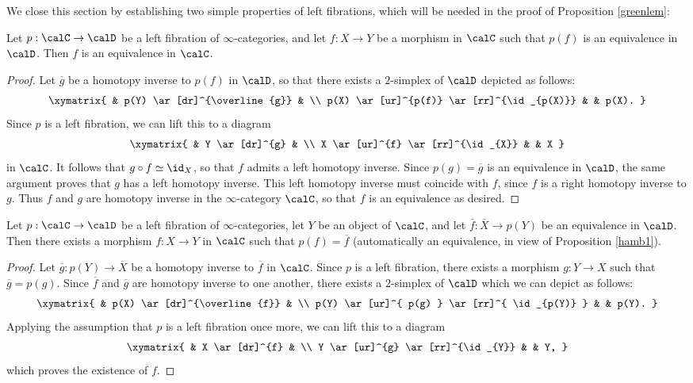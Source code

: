 We close this section by establishing two simple properties of left fibrations, which will be needed in the proof of Proposition \ref{greenlem}:

\begin{proposition}\label{hamb1}
Let $p: \calC \rightarrow \calD$ be a left fibration of $\infty$-categories, and let
$f: X \rightarrow Y$ be a morphism in $\calC$ such that $p(f)$ is an equivalence in
$\calD$. Then $f$ is an equivalence in $\calC$.
\end{proposition}

\begin{proof}
Let $\overline{g}$ be a homotopy inverse to $p(f)$ in $\calD$, so that
there exists a $2$-simplex of $\calD$ depicted as follows:
$$ \xymatrix{ & p(Y) \ar[dr]^{\overline{g}} & \\
p(X) \ar[ur]^{p(f)} \ar[rr]^{\id_{p(X)}} & & p(X). }$$
Since $p$ is a left fibration, we can lift this to a diagram
$$ \xymatrix{ & Y \ar[dr]^{g} & \\
X \ar[ur]^{f} \ar[rr]^{\id_{X}} & & X }$$
in $\calC$. It follows that $g \circ f \simeq \id_{X}$, so that $f$ admits a left homotopy inverse.
Since $p(g) = \overline{g}$ is an equivalence in $\calD$, the same argument proves that
$g$ has a left homotopy inverse. This left homotopy inverse must coincide with $f$, since $f$ is a right homotopy inverse to $g$. Thus $f$ and $g$ are homotopy inverse in the $\infty$-category $\calC$, so that $f$ is an equivalence as desired.
\end{proof}

\begin{proposition}\label{hamb2}
Let $p: \calC \rightarrow \calD$ be a left fibration of $\infty$-categories, let
$Y$ be an object of $\calC$, and let
$\overline{f}: \overline{X} \rightarrow p(Y)$ be an equivalence in $\calD$. Then
there exists a morphism $f: X \rightarrow Y$ in $\calC$ such that $p(f) = \overline{f}$
(automatically an equivalence, in view of Proposition \ref{hamb1}). 
\end{proposition}

\begin{proof}
Let $\overline{g}: p(Y) \rightarrow \overline{X}$ be a homotopy inverse to $\overline{f}$
in $\calC$. Since $p$ is a left fibration, there exists a morphism
$g: Y \rightarrow X$ such that $\overline{g} = p(g)$. Since $\overline{f}$ and $\overline{g}$
are homotopy inverse to one another, there exists a $2$-simplex of $\calD$ which we can depict as follows:
$$ \xymatrix{ & p(X) \ar[dr]^{\overline{f}} & \\
p(Y) \ar[ur]^{ p(g) } \ar[rr]^{ \id_{p(Y)} } & & p(Y). }$$
Applying the assumption that $p$ is a left fibration once more, we can lift this to a diagram
$$ \xymatrix{ & X \ar[dr]^{f} & \\
Y \ar[ur]^{g} \ar[rr]^{\id_{Y}} & & Y, }$$
which proves the existence of $f$.
\end{proof}

